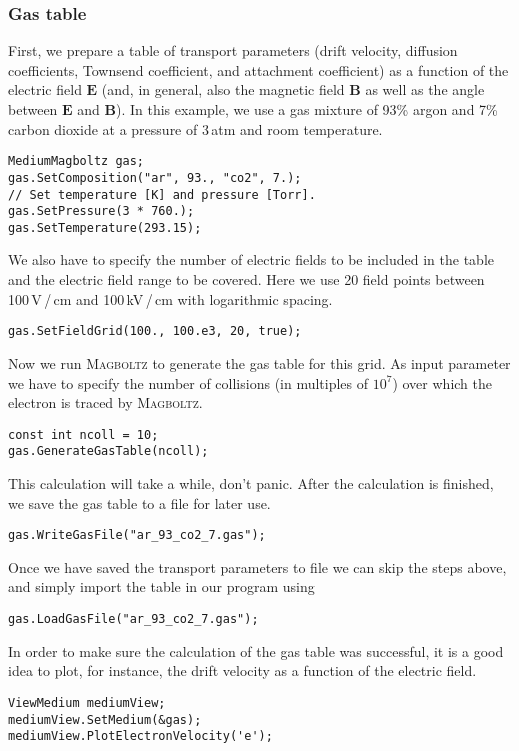 \subsubsection{Gas table}
First, we prepare a table of transport parameters 
(drift velocity, diffusion coefficients, Townsend coefficient,
and attachment coefficient) as a function 
of the electric field \(\mathbf{E}\)  
(and, in general, also the magnetic field \(\mathbf{B}\) 
as well as the angle between \(\mathbf{E}\) and \(\mathbf{B}\)).
In this example, we use a gas mixture of 93\% argon and 7\% 
carbon dioxide at a pressure of 3\,atm and room temperature.
\begin{lstlisting}
MediumMagboltz gas;
gas.SetComposition("ar", 93., "co2", 7.);
// Set temperature [K] and pressure [Torr].
gas.SetPressure(3 * 760.);
gas.SetTemperature(293.15);
\end{lstlisting} 
We also have to specify the number of electric fields to be 
included in the table and the electric field range to be covered. 
Here we use 20 field points between 100\,V\,/\,cm and 100\,kV\,/\,cm 
with logarithmic spacing. 
\begin{lstlisting}
gas.SetFieldGrid(100., 100.e3, 20, true);
\end{lstlisting}
Now we run \textsc{Magboltz} to generate the gas table for this grid. 
As input parameter we have to specify the number of collisions 
(in multiples of \(10^{7}\)) over which the electron is traced 
by \textsc{Magboltz}.
\begin{lstlisting}
const int ncoll = 10;
gas.GenerateGasTable(ncoll);
\end{lstlisting}
This calculation will take a while, don't panic. 
After the calculation is finished, we save the gas table to a 
file for later use.
\begin{lstlisting}
gas.WriteGasFile("ar_93_co2_7.gas");
\end{lstlisting}
Once we have saved the transport parameters to file 
we can skip the steps above, 
and simply import the table in our program using
\begin{lstlisting}
gas.LoadGasFile("ar_93_co2_7.gas");
\end{lstlisting} 

In order to make sure the calculation of the gas table was successful, 
it is a good idea to plot, for instance, 
the drift velocity as a function of the electric field.
\begin{lstlisting}
ViewMedium mediumView;
mediumView.SetMedium(&gas);
mediumView.PlotElectronVelocity('e');
\end{lstlisting}
